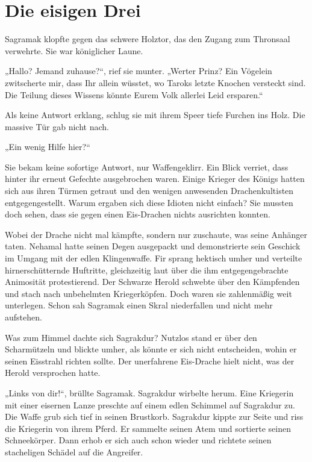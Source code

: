 \newpage
\section{Die eisigen Drei}


Sagramak klopfte gegen das schwere Holztor, das den Zugang zum Thronsaal verwehrte. Sie war königlicher Laune.

„Hallo? Jemand zuhause?“, rief sie munter. „Werter Prinz? Ein Vögelein zwitscherte mir, dass Ihr allein wüsstet, wo Taroks letzte Knochen versteckt sind. Die Teilung dieses Wissens könnte Eurem Volk allerlei Leid ersparen.“

Als keine Antwort erklang, schlug sie mit ihrem Speer tiefe Furchen ins Holz. Die massive Tür gab nicht nach.

„Ein wenig Hilfe hier?“

Sie bekam keine sofortige Antwort, nur Waffengeklirr. Ein Blick verriet, dass hinter ihr erneut Gefechte ausgebrochen waren. Einige Krieger des Königs hatten sich aus ihren Türmen getraut und den wenigen anwesenden Drachenkultisten entgegengestellt. Warum ergaben sich diese Idioten nicht einfach? Sie mussten doch sehen, dass sie gegen einen Eis-Drachen nichts ausrichten konnten.

Wobei der Drache nicht mal kämpfte, sondern nur zuschaute, was seine Anhänger taten. Nehamal hatte seinen Degen ausgepackt und demonstrierte sein Geschick im Umgang mit der edlen Klingenwaffe. Fir sprang hektisch umher und verteilte hirnerschütternde Huftritte, gleichzeitig laut über die ihm entgegengebrachte Animosität protestierend. Der Schwarze Herold schwebte über den Kämpfenden und stach nach unbehelmten Kriegerköpfen. Doch waren sie zahlenmäßig weit unterlegen. Schon sah Sagramak einen Skral niederfallen und nicht mehr aufstehen.

Was zum Himmel dachte sich Sagrakdur? Nutzlos stand er über den Scharmützeln und blickte umher, als könnte er sich nicht entscheiden, wohin er seinen Eisstrahl richten sollte. Der unerfahrene Eis-Drache hielt nicht, was der Herold versprochen hatte.

„Links von dir!“, brüllte Sagramak. Sagrakdur wirbelte herum. Eine Kriegerin mit einer eisernen Lanze preschte auf einem edlen Schimmel auf Sagrakdur zu. Die Waffe grub sich tief in seinen Brustkorb. Sagrakdur kippte zur Seite und riss die Kriegerin von ihrem Pferd. Er sammelte seinen Atem und sortierte seinen Schneekörper. Dann erhob er sich auch schon wieder und richtete seinen stacheligen Schädel auf die Angreifer.

